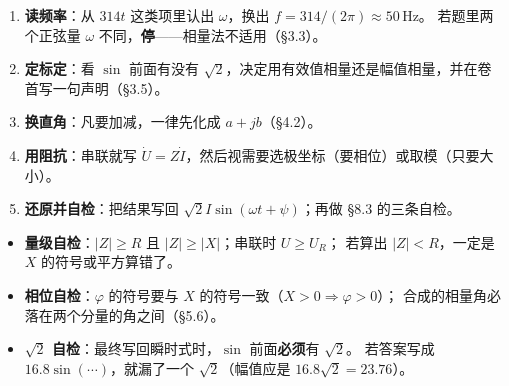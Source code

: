 \documentclass[11pt]{ctexart}
\begin{document}

\begin{enumerate}
\item \textbf{读频率}：从 $314t$ 这类项里认出 $\omega$，换出 $f=314/(2\pi)\approx50\,\mathrm{Hz}$。
若题里两个正弦量 $\omega$ 不同，\textbf{停}——相量法不适用（§3.3）。
\item \textbf{定标定}：看 $\sin$ 前面有没有 $\sqrt2$，决定用有效值相量还是幅值相量，并在卷首写一句声明（§3.5）。
\item \textbf{换直角}：凡要加减，一律先化成 $a+jb$（§4.2）。
\item \textbf{用阻抗}：串联就写 $\dot U=Z\dot I$，然后视需要选极坐标（要相位）或取模（只要大小）。
\item \textbf{还原并自检}：把结果写回 $\sqrt2I\sin(\omega t+\psi)$；再做 §8.3 的三条自检。
\end{enumerate}


\begin{itemize}
\item \textbf{量级自检}：$|Z|\ge R$ 且 $|Z|\ge|X|$；串联时 $U\ge U_R$；
若算出 $|Z|<R$，一定是 $X$ 的符号或平方算错了。
\item \textbf{相位自检}：$\varphi$ 的符号要与 $X$ 的符号一致（$X>0\Rightarrow\varphi>0$）；
合成的相量角必落在两个分量的角之间（§5.6）。
\item \textbf{$\sqrt2$ 自检}：最终写回瞬时式时，$\sin$ 前面\textbf{必须}有 $\sqrt2$。
若答案写成 $16.8\sin(\cdots)$，就漏了一个 $\sqrt2$（幅值应是 $16.8\sqrt2=23.76$）。
\end{itemize}




\end{document}
